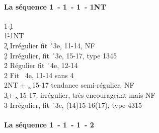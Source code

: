 \documentclass[a4paper]{article}
\begin{document}
\paragraph{La séquence 1\pdfc\ - 1\pdfd\ - 1\pdfh\ - 1NT}

\begin{bidtable}
1\c-1\d\\
1\h-1NT\\
2\c \> Irrégulier fit \h\ 3e, 11-14, NF\\
2\d \> Irrégulier, fit \h\ 3e, 15-17, type 1345\\
2\h \> Régulier fit \h\ 4e, 12-14\\
2\s \> Fit \s\ 4e, 11-14 sans 4\h \\
2NT + \c , 15-17 tendance semi-régulier, NF\\
3\c {}+ \c , 15-17, irrégulier, très encourageant mais NF\\
3\s \> Irrégulier, fit \h\ 3e, (14)15-16(17), type 4315
\end{bidtable}

\paragraph{La séquence 1\pdfc\ - 1\pdfd\ - 1\pdfh\ - 2\pdfc}
\end{document}
